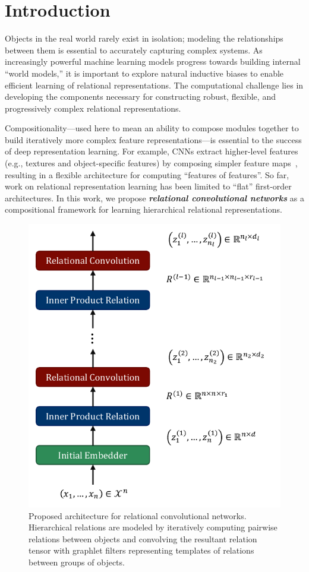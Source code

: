 \section{Introduction}\label{sec:intro}

Objects in the real world rarely exist in isolation; 
modeling the relationships between them is essential to accurately capturing complex systems. As increasingly powerful machine learning models progress towards building internal ``world models,'' it is important to explore natural inductive biases to enable efficient learning of relational representations. The computational challenge lies in developing the components necessary for constructing robust, flexible, and progressively complex relational representations.

Compositionality---used here to mean an ability to compose modules together to build iteratively more complex feature representations---is essential to the success of deep representation learning. 
For example, CNNs extract higher-level features (e.g., textures and object-specific features) by composing simpler feature maps~\citep{zeiler2014visualizing}, resulting in a flexible architecture for computing ``features of features''.
So far, work on relational representation learning has been limited to ``flat'' first-order architectures. In this work, we propose \textit{\bfseries relational convolutional networks} as a compositional framework for learning hierarchical relational representations.

\begin{figure}
    \centering
    \vskip-12pt
    \includegraphics[width=.48\textwidth]{figs/relconv_architecture.pdf}
    \vskip-12pt
    \caption{Proposed architecture for relational convolutional networks. Hierarchical relations are modeled by iteratively computing pairwise relations between objects and convolving the resultant relation tensor with graphlet filters representing templates of relations between groups of objects.
    }\label{fig:relconv_architecture}
\end{figure}

